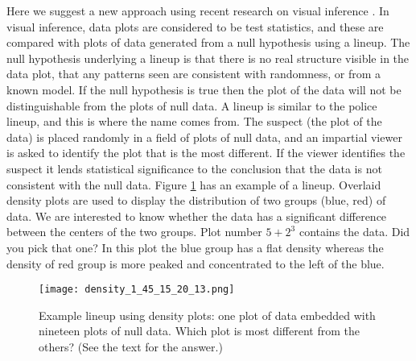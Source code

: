 

Here we suggest a new approach using recent research on visual inference \cite{buja:2009,wickham:2010}. In visual inference, data plots are considered to be test statistics, and these are compared with plots of data generated from a null hypothesis using a lineup. The null hypothesis underlying a lineup is that there is no real structure visible in the data plot, that any patterns seen are consistent with randomness, or from a known model. If the null hypothesis is true then the plot of the data will not be distinguishable from the plots of null data. A lineup is similar to the police lineup, and this is where the name comes from. The suspect (the plot of the data) is placed randomly in a field of plots of null data, and an impartial viewer is asked to identify the plot that is the most different. If the viewer identifies the suspect it lends statistical significance to the conclusion that the data is not consistent with the null data. Figure \ref{lineup} has an example of a lineup. Overlaid density plots are used to display the distribution of two groups (blue, red) of data. We are interested to know whether the data has a significant difference between the centers of the two groups. Plot number $5+2^3$ contains the data. Did you pick that one? In this plot the blue group has a flat density whereas the density of red group is more peaked and concentrated to the left of the blue.

\begin{figure}[htbp]
   \centering
   \texttt{[image: density\_1\_45\_15\_20\_13.png]} 
   \caption{Example lineup using density plots: one plot of data
     embedded with nineteen plots of null data. Which plot is
     most different from the others? (See the text for the answer.)}
   \label{lineup}
\end{figure}

